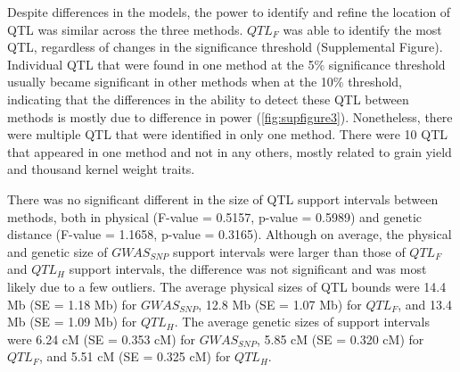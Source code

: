 \documentclass[article,9pt,twocolumn,twoside]{rilabRxiv}
\begin{document}
Despite differences in the models, the power to identify and refine the location of QTL was similar across the three methods.
$QTL_F$ was able to identify the most QTL, regardless of changes in the significance threshold (Supplemental Figure).
Individual QTL that were found in one method at the 5\% significance threshold usually became significant in other methods when at the 10\% threshold, indicating that the differences in the ability to detect these QTL between methods is mostly due to difference in power (\ref{fig:supfigure3}).
Nonetheless, there were multiple QTL that were identified in only one method. There were 10 QTL that appeared in one method and not in any others, mostly related to grain yield and thousand kernel weight traits.

There was no significant different in the size of QTL support intervals between methods, both in physical (F-value = 0.5157, p-value = 0.5989) and genetic distance (F-value = 1.1658, p-value = 0.3165).
Although on average, the physical and genetic size of $GWAS_{SNP}$ support intervals were larger than those of $QTL_F$ and $QTL_H$ support intervals, the difference was not significant and was most likely due to a few outliers.
The average physical sizes of QTL bounds were 14.4 Mb (SE = 1.18 Mb) for $GWAS_{SNP}$, 12.8 Mb (SE = 1.07 Mb) for $QTL_F$, and 13.4 Mb (SE = 1.09 Mb) for $QTL_H$.
The average genetic sizes of support intervals were 6.24 cM (SE = 0.353 cM) for $GWAS_{SNP}$, 5.85 cM (SE = 0.320 cM) for $QTL_F$, and 5.51 cM (SE = 0.325 cM) for $QTL_H$. 
\end{document}
